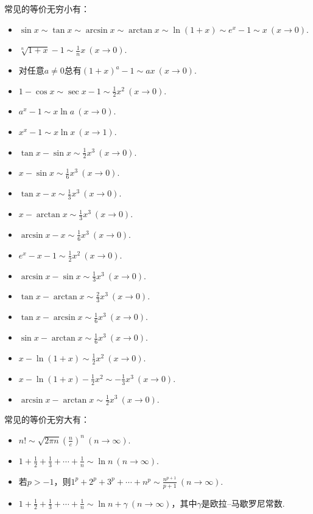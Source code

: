 常见的等价无穷小有：
\begin{itemize}
	\item \(\sin x%
		\sim \tan x%
		\sim \arcsin x%
		\sim \arctan x%
		\sim \ln(1+x)%
		\sim e^x-1%
		\sim x\ (x\to0)\).
	\item \(\sqrt[n]{1+x} - 1 \sim \frac1n x\ (x\to0)\).
	\item 对任意\(a\neq0\)总有\((1+x)^a-1 \sim ax\ (x\to0)\).%
	\item \(1-\cos x%
		\sim \sec x-1%
		\sim \frac12 x^2\ (x\to0)\).
	\item \(a^x-1 \sim x \ln a\ (x\to0)\).%
	\item \(x^x-1 \sim x \ln x\ (x\to1)\).%
	\item \(\tan x - \sin x \sim \frac12 x^3\ (x\to0)\).
	\item \(x - \sin x \sim \frac16 x^3\ (x\to0)\).
	\item \(\tan x - x \sim \frac13 x^3\ (x\to0)\).
	\item \(x - \arctan x \sim \frac13 x^3\ (x\to0)\).
	\item \(\arcsin x - x \sim \frac16 x^3\ (x\to0)\).
	\item \(e^x - x - 1 \sim \frac12 x^2\ (x\to0)\).
	\item \(\arcsin x - \sin x \sim \frac13 x^3\ (x\to0)\).
	\item \(\tan x - \arctan x \sim \frac23 x^3\ (x\to0)\).
	\item \(\tan x - \arcsin x \sim \frac16 x^3\ (x\to0)\).
	\item \(\sin x - \arctan x \sim \frac16 x^3\ (x\to0)\).
	\item \(x - \ln(1+x) \sim \frac12 x^2\ (x\to0)\).
	\item \(x - \ln(1+x) - \frac12 x^2 \sim -\frac13 x^3\ (x\to0)\).
	\item \(\arcsin x - \arctan x \sim \frac12 x^3\ (x\to0)\).
\end{itemize}

常见的等价无穷大有：
\begin{itemize}
	\item \(n! \sim \sqrt{2 \pi n} \left( \frac{n}{e} \right)^n\ (n\to\infty)\).
	\item \(1+\frac12+\frac13+\dotsb+\frac1n \sim \ln n\ (n\to\infty)\).
	\item 若\(p>-1\)，则\(1^p+2^p+3^p+\dotsb+n^p \sim \frac{n^{p+1}}{p+1}\ (n\to\infty)\).%
	\item \(1+\frac12+\frac13+\dotsb+\frac1n \sim \ln n + \gamma\ (n\to\infty)\)，其中\(\gamma\)是欧拉--马歇罗尼常数.%
\end{itemize}

